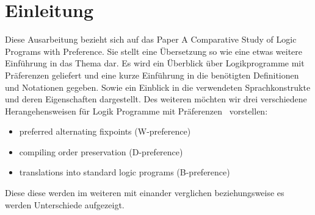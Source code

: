 \section{Einleitung}
Diese Ausarbeitung bezieht sich auf das Paper \glqq A Comparative Study of Logic Programs with Preference\grqq\cite{SchaubWang}.
Sie stellt eine Übersetzung so wie eine etwas weitere Einführung in das Thema dar.
Es wird ein Überblick über Logikprogramme mit Präferenzen geliefert und eine kurze Einführung in die benötigten Definitionen und Notationen gegeben.
Sowie ein Einblick in die verwendeten Sprachkonstrukte und deren Eigenschaften dargestellt.
Des weiteren möchten wir drei verschiedene Herangehensweisen für \glqq Logik Programme mit Präferenzen\grqq~ vorstellen:
\begin{itemize}
  \item preferred alternating fixpoints (W-preference)
  \item compiling order preservation (D-preference)
  \item translations into standard logic programs (B-preference)
\end{itemize}
Diese diese werden im weiteren mit einander verglichen beziehungsweise es werden Unterschiede aufgezeigt.
